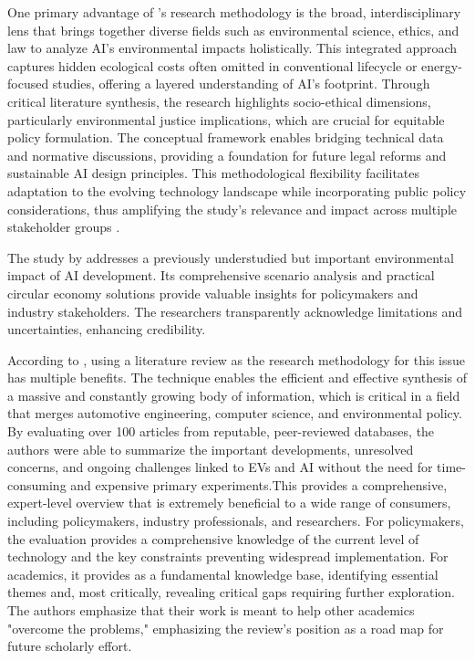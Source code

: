 \documentclass[a4paper, 12pt]{article}
\begin{document}
\par One primary advantage of \citet{Zhuk2023}'s research methodology is the broad, interdisciplinary lens that brings together diverse fields such as environmental science, ethics, and law to analyze AI’s environmental impacts holistically. This integrated approach captures hidden ecological costs often omitted in conventional lifecycle or energy-focused studies, offering a layered understanding of AI's footprint. Through critical literature synthesis, the research highlights socio-ethical dimensions, particularly environmental justice implications, which are crucial for equitable policy formulation. The conceptual framework enables bridging technical data and normative discussions, providing a foundation for future legal reforms and sustainable AI design principles. This methodological flexibility facilitates adaptation to the evolving technology landscape while incorporating public policy considerations, thus amplifying the study’s relevance and impact across multiple stakeholder groups \citep[pp.~960--963]{Zhuk2023}. \hfill \break
\par The study by \cite{wang_2024_ewaste} addresses a previously understudied but important environmental impact of AI development. Its comprehensive scenario analysis and practical circular economy solutions provide valuable insights for policymakers and industry stakeholders. The researchers transparently acknowledge limitations and uncertainties, enhancing credibility. \hfill \break
\par According to \citet{M.rauf2024}, using a literature review as the research methodology for this issue has multiple benefits.   The technique enables the efficient and effective synthesis of a massive and constantly growing body of information, which is critical in a field that merges automotive engineering, computer science, and environmental policy. By evaluating over 100 articles from reputable, peer-reviewed databases, the authors were able to summarize the important developments, unresolved concerns, and ongoing challenges linked to EVs and AI without the need for time-consuming and expensive primary experiments.This provides a comprehensive, expert-level overview that is extremely beneficial to a wide range of consumers, including policymakers, industry professionals, and researchers.  For policymakers, the evaluation provides a comprehensive knowledge of the current level of technology and the key constraints preventing widespread implementation.  For academics, it provides as a fundamental knowledge base, identifying essential themes and, most critically, revealing critical gaps requiring further exploration.  The authors emphasize that their work is meant to help other academics "overcome the problems," emphasizing the review's position as a road map for future scholarly effort.
\end{document}
